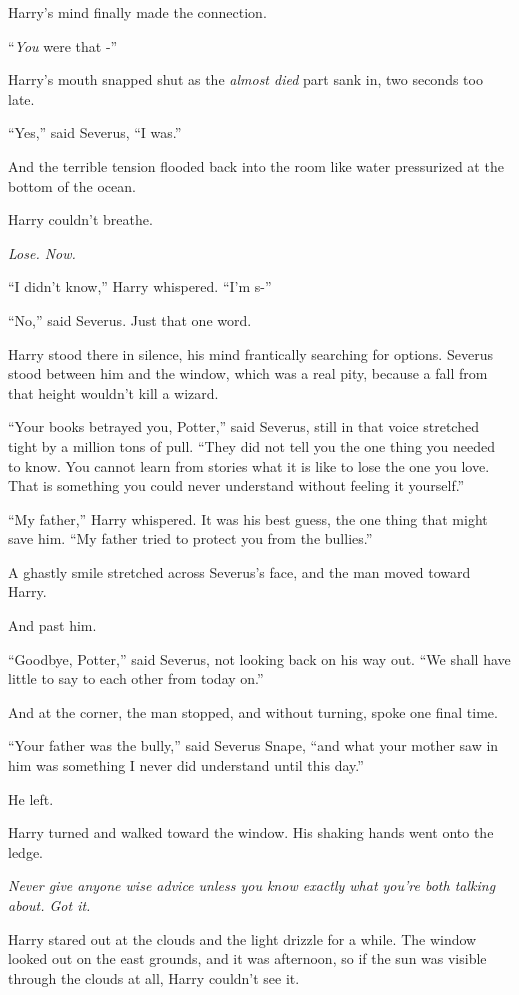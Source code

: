 Harry's mind finally made the connection.

``\emph{You} were that -''

Harry's mouth snapped shut as the \emph{almost died} part sank in, two
seconds too late.

``Yes,'' said Severus, ``I was.''

And the terrible tension flooded back into the room like water
pressurized at the bottom of the ocean.

Harry couldn't breathe.

\emph{Lose. Now.}

``I didn't know,'' Harry whispered. ``I'm s-''

``No,'' said Severus. Just that one word.

Harry stood there in silence, his mind frantically searching for
options. Severus stood between him and the window, which was a real
pity, because a fall from that height wouldn't kill a wizard.

``Your books betrayed you, Potter,'' said Severus, still in that voice
stretched tight by a million tons of pull. ``They did not tell you the
one thing you needed to know. You cannot learn from stories what it is
like to lose the one you love. That is something you could never
understand without feeling it yourself.''

``My father,'' Harry whispered. It was his best guess, the one thing
that might save him. ``My father tried to protect you from the
bullies.''

A ghastly smile stretched across Severus's face, and the man moved
toward Harry.

And past him.

``Goodbye, Potter,'' said Severus, not looking back on his way out. ``We
shall have little to say to each other from today on.''

And at the corner, the man stopped, and without turning, spoke one final
time.

``Your father was the bully,'' said Severus Snape, ``and what your
mother saw in him was something I never did understand until this day.''

He left.

Harry turned and walked toward the window. His shaking hands went onto
the ledge.

\emph{Never give anyone wise advice unless you know exactly what you're
both talking about. Got it.}

Harry stared out at the clouds and the light drizzle for a while. The
window looked out on the east grounds, and it was afternoon, so if the
sun was visible through the clouds at all, Harry couldn't see it.


